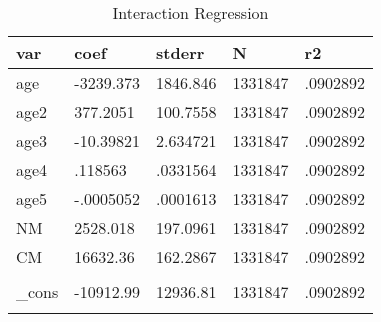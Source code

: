 \documentclass{article}
\begin{document}
\begin{table}[tbp] \centering
{}

\caption{Interaction Regression}
\begin{tabularx}{\textwidth}{lCCCC}

\toprule
{var}&{coef}&{stderr}&{N}&{r2} \tabularnewline
\midrule\addlinespace[1.5ex]
age&-3239.373&1846.846&1331847&.0902892 \tabularnewline
age2&377.2051&100.7558&1331847&.0902892 \tabularnewline
age3&-10.39821&2.634721&1331847&.0902892 \tabularnewline
age4&.118563&.0331564&1331847&.0902892 \tabularnewline
age5&-.0005052&.0001613&1331847&.0902892 \tabularnewline
NM&2528.018&197.0961&1331847&.0902892 \tabularnewline
CM&16632.36&162.2867&1331847&.0902892 \tabularnewline
\\_cons&-10912.99&12936.81&1331847&.0902892 \tabularnewline
\bottomrule \addlinespace[1.5ex]

\end{tabularx}
\end{table}
\end{document}
